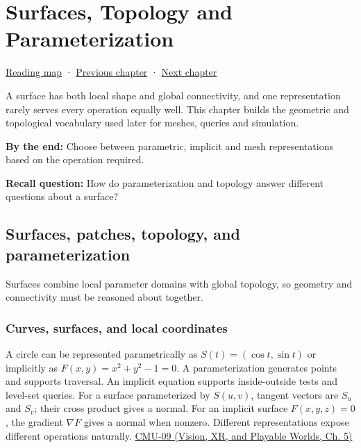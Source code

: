 \chapter{Surfaces, Topology and Parameterization}\label{03-visual-computing-i-ch002-surfaces-topology-and-parameterization}\hypertarget{03-visual-computing-i-ch002}{}\label{stagechapter:03-visual-computing-i-ch002}

\hyperref[volume-reading-map]{Reading map} · \hyperref[03-visual-computing-i-ch001-from-worlds-to-images-and-inference]{Previous chapter} · \hyperref[03-visual-computing-i-ch003-lens-optics-and-image-formation]{Next chapter}

A surface has both local shape and global connectivity, and one representation rarely serves every operation equally well. This chapter builds the geometric and topological vocabulary used later for meshes, queries and simulation.

\textbf{By the end:} Choose between parametric, implicit and mesh representations based on the operation required.

\textbf{Recall question:} How do parameterization and topology answer different questions about a surface?

\section{Surfaces, patches, topology, and parameterization}\label{03-visual-computing-i-ch002-surfaces-patches-topology-and-parameterization}

Surfaces combine local parameter domains with global topology, so geometry and connectivity must be reasoned about together.

\subsection{Curves, surfaces, and local coordinates}\label{03-visual-computing-i-ch002-curves-surfaces-and-local-coordinates}

A circle can be represented parametrically as \(S(t)=(\cos t,\sin t)\) or implicitly as \(F(x,y)=x^2+y^2-1=0\). A parameterization generates points and supports traversal. An implicit equation supports inside-outside tests and level-set queries. For a surface parameterized by \(S(u,v)\), tangent vectors are \(S_u\) and \(S_v\); their cross product gives a normal. For an implicit surface \(F(x,y,z)=0\), the gradient \(\nabla F\) gives a normal when nonzero. Different representations expose different operations naturally. \href{../07-Vision-XR-and-Playable-Worlds/main.pdf\#nameddest=04-visual-computing-ii-ch036-cmu-09---introduction-to-geometry}{CMU-09 (Vision, XR, and Playable Worlds, Ch. 5)}

